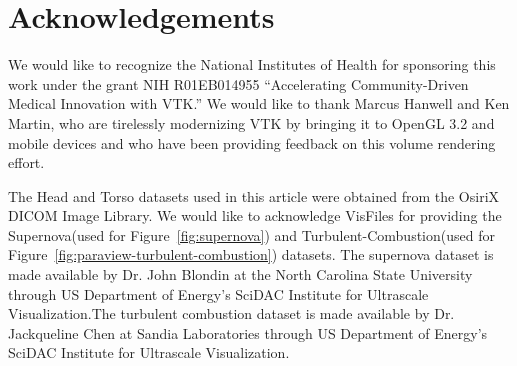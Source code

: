 \section{Acknowledgements}
We would like to recognize the National Institutes of Health for sponsoring this
work under the grant NIH R01EB014955 “Accelerating Community-Driven Medical
Innovation with VTK.” We would like to thank Marcus Hanwell and Ken Martin, who
are tirelessly modernizing VTK by bringing it to OpenGL 3.2 and mobile devices
and who have been providing feedback on this volume rendering effort.

The Head and Torso datasets used in this article were obtained from the OsiriX
DICOM Image Library\cite{_osirix_2017}. We would like to acknowledge
VisFiles\cite{_visfiles_2007} for providing the Supernova(used for
Figure~\ref{fig:supernova}) and Turbulent-Combustion(used for
Figure~\ref{fig:paraview-turbulent-combustion}) datasets. The supernova dataset
is made available by Dr. John Blondin at the North Carolina State University
through US Department of Energy's SciDAC Institute for Ultrascale
Visualization.The turbulent combustion dataset is made available by Dr.
Jackqueline Chen at Sandia Laboratories through US Department of Energy's SciDAC
Institute for Ultrascale Visualization.
